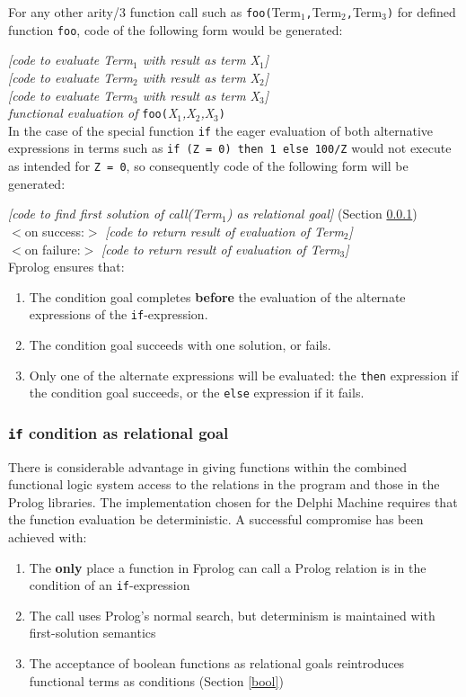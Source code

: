 \documentclass[a4paper,11pt,twoside]{article}
\begin{document}
For any other arity/3 function call such as
\mbox{\texttt{foo(}Term$_1$\texttt{,}Term$_2$\texttt{,}Term$_3$\texttt{)}}
for defined function \texttt{foo}, code
of the following form would be generated:

\textit{[code to evaluate Term$_1$ with result as term X$_1$]} \\[1mm]
\textit{[code to evaluate Term$_2$ with result as term X$_2$]} \\[1mm]
\textit{[code to evaluate Term$_3$ with result as term X$_3$]} \\[1mm]
\textit{functional evaluation of} \texttt{foo(}\textit{X$_1$,X$_2$,X$_3$}\texttt{)}\\

In the case of the special function \texttt{if} the eager evaluation of both
alternative expressions in terms such as 
\texttt{if (Z = 0) then 1 else 100/Z} would
not execute as intended for \texttt{Z = 0}, so consequently
code of the following form will be generated:

\textit{[code to find first solution of call(Term$_1$) 
   as relational goal]} (Section \ref{if:cond}) \\[1mm]
$<$on success:$>$ \textit{[code to return result of evaluation of Term$_2$]} \\[1mm]
$<$on failure:$>$ \textit{[code to return result of evaluation of Term$_3$]} \\


Fprolog ensures that:
\begin{enumerate}
\item{The condition goal completes \textbf{before} the evaluation of the
  alternate expressions of the \texttt{if}-expression.}
\item{The condition goal succeeds with one solution, or fails.}
\item{Only one of the alternate expressions will be evaluated: the \texttt{then}
  expression if the condition goal succeeds, or the \texttt{else} expression
  if it fails.}
\end{enumerate}

\subsubsection{\texttt{if} condition as relational goal}
\label{if:cond}

There is considerable advantage in giving functions within the combined
functional logic system access to the relations in the program and those in
the Prolog libraries.  The implementation chosen for the Delphi Machine
requires that the function evaluation be deterministic.  A successful
compromise has been achieved with:
\begin{enumerate}
\item{The \textbf{only} place a function in Fprolog can call a Prolog
  relation is in the condition of an \texttt{if}-expression}
\item{The call uses Prolog's normal search, but determinism is maintained with
  first-solution semantics}
\item{The acceptance of boolean functions as relational goals reintroduces
  functional terms as conditions (Section \ref{bool})}
\end{enumerate}
\end{document}
